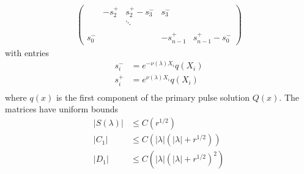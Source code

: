 \documentclass[thesis.tex]{subfiles}
\begin{document}
\begin{lemma}
\begin{align*}
\begin{pmatrix}
& -s_2^+ & s_2^+ - s_3^- & s_3^- \\ && \ddots \\
\\
s_0^- &&& -s_{n-1}^+ & s_{n-1}^+ - s_0^- 
\end{pmatrix}
\end{align*}
with entries
\begin{align*}
s_i^- &= e^{-\nu(\lambda)X_i} q(X_i)\\
s_i^+ &= e^{\nu(\lambda)X_i} q(X_i)\\
\end{align*}
where $q(x)$ is the first component of the primary pulse solution $Q(x)$. The matrices have uniform bounds
\begin{align}\label{centerjumprem}
|S(\lambda)| &\leq C\left(r^{1/2}\right) \\
|C_1| &\leq C\left(|\lambda|(|\lambda| + r^{1/2})\right) \\
|D_1| &\leq C\left(|\lambda|(|\lambda| + r^{1/2})^2\right)
\end{align}


\end{lemma}
\end{document}
